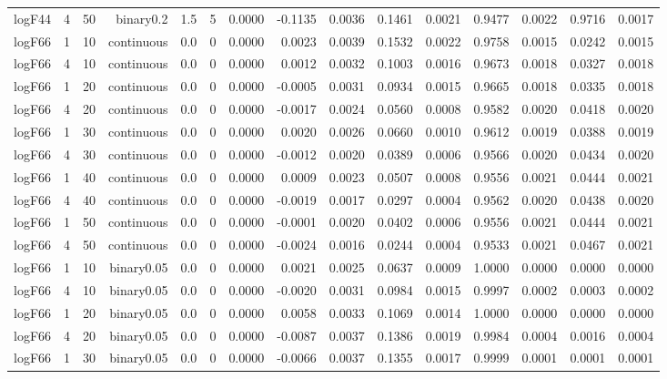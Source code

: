 \begin{longtable}{rrrrrrrrrrrrrrr}
  logF44 & 4 & 50 & binary0.2 & 1.5 & 5 & 0.0000 & -0.1135 & 0.0036 & 0.1461 & 0.0021 & 0.9477 & 0.0022 & 0.9716 & 0.0017 \\ 
  logF66 & 1 & 10 & continuous & 0.0 & 0 & 0.0000 & 0.0023 & 0.0039 & 0.1532 & 0.0022 & 0.9758 & 0.0015 & 0.0242 & 0.0015 \\ 
  logF66 & 4 & 10 & continuous & 0.0 & 0 & 0.0000 & 0.0012 & 0.0032 & 0.1003 & 0.0016 & 0.9673 & 0.0018 & 0.0327 & 0.0018 \\ 
  logF66 & 1 & 20 & continuous & 0.0 & 0 & 0.0000 & -0.0005 & 0.0031 & 0.0934 & 0.0015 & 0.9665 & 0.0018 & 0.0335 & 0.0018 \\ 
  logF66 & 4 & 20 & continuous & 0.0 & 0 & 0.0000 & -0.0017 & 0.0024 & 0.0560 & 0.0008 & 0.9582 & 0.0020 & 0.0418 & 0.0020 \\ 
  logF66 & 1 & 30 & continuous & 0.0 & 0 & 0.0000 & 0.0020 & 0.0026 & 0.0660 & 0.0010 & 0.9612 & 0.0019 & 0.0388 & 0.0019 \\ 
  logF66 & 4 & 30 & continuous & 0.0 & 0 & 0.0000 & -0.0012 & 0.0020 & 0.0389 & 0.0006 & 0.9566 & 0.0020 & 0.0434 & 0.0020 \\ 
  logF66 & 1 & 40 & continuous & 0.0 & 0 & 0.0000 & 0.0009 & 0.0023 & 0.0507 & 0.0008 & 0.9556 & 0.0021 & 0.0444 & 0.0021 \\ 
  logF66 & 4 & 40 & continuous & 0.0 & 0 & 0.0000 & -0.0019 & 0.0017 & 0.0297 & 0.0004 & 0.9562 & 0.0020 & 0.0438 & 0.0020 \\ 
  logF66 & 1 & 50 & continuous & 0.0 & 0 & 0.0000 & -0.0001 & 0.0020 & 0.0402 & 0.0006 & 0.9556 & 0.0021 & 0.0444 & 0.0021 \\ 
  logF66 & 4 & 50 & continuous & 0.0 & 0 & 0.0000 & -0.0024 & 0.0016 & 0.0244 & 0.0004 & 0.9533 & 0.0021 & 0.0467 & 0.0021 \\ 
  logF66 & 1 & 10 & binary0.05 & 0.0 & 0 & 0.0000 & 0.0021 & 0.0025 & 0.0637 & 0.0009 & 1.0000 & 0.0000 & 0.0000 & 0.0000 \\ 
  logF66 & 4 & 10 & binary0.05 & 0.0 & 0 & 0.0000 & -0.0020 & 0.0031 & 0.0984 & 0.0015 & 0.9997 & 0.0002 & 0.0003 & 0.0002 \\ 
  logF66 & 1 & 20 & binary0.05 & 0.0 & 0 & 0.0000 & 0.0058 & 0.0033 & 0.1069 & 0.0014 & 1.0000 & 0.0000 & 0.0000 & 0.0000 \\ 
  logF66 & 4 & 20 & binary0.05 & 0.0 & 0 & 0.0000 & -0.0087 & 0.0037 & 0.1386 & 0.0019 & 0.9984 & 0.0004 & 0.0016 & 0.0004 \\ 
  logF66 & 1 & 30 & binary0.05 & 0.0 & 0 & 0.0000 & -0.0066 & 0.0037 & 0.1355 & 0.0017 & 0.9999 & 0.0001 & 0.0001 & 0.0001 \\ 

\end{longtable}
